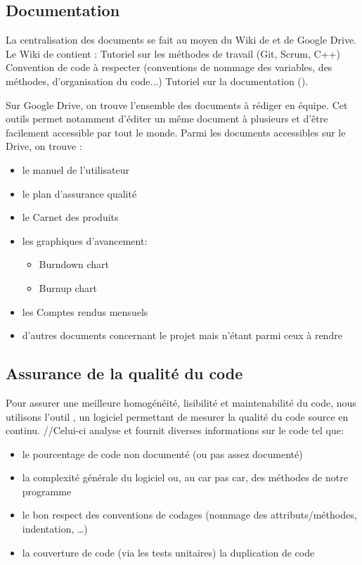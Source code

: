 \subsection{Documentation}
La centralisation des documents se fait au moyen du Wiki de  et de Google Drive. 
Le Wiki de  contient :
Tutoriel sur les méthodes de travail (Git, Scrum, C++)
Convention de code à respecter (conventions de nommage des variables, des méthodes, d’organisation du code...)
Tutoriel sur la documentation ().

Sur Google Drive, on trouve l’ensemble des documents à rédiger en équipe. Cet outils permet notamment d’éditer un même document à plusieurs et d’être facilement accessible par tout le monde. Parmi les documents accessibles sur le Drive, on trouve :
\begin{itemize}
	\item le manuel de l’utilisateur
	\item le plan d'assurance qualité
	\item le Carnet des produits 
	\item les graphiques d’avancement:
	\begin{itemize}
		\item Burndown chart
		\item Burnup chart
	\end{itemize}
	\item les Comptes rendus mensuels
	\item d’autres documents concernant le projet mais n’étant parmi ceux à rendre
\end{itemize}
 
\subsection{Assurance de la qualité du code}
Pour assurer une meilleure homogénéité, lisibilité et maintenabilité du code, nous utilisons l’outil , un logiciel permettant de mesurer la qualité du code source  en continu. 
//Celui-ci analyse et fournit diverses informations sur le code tel que:
\begin{itemize}
	\item le pourcentage de code non documenté (ou pas assez documenté)
	\item la complexité générale du logiciel ou, au car pas car, des méthodes de notre programme
	\item le bon respect des conventions de codages (nommage des attributs/méthodes, indentation, …)
	\item la couverture de code (via les tests unitaires) la duplication de code
\end{itemize}